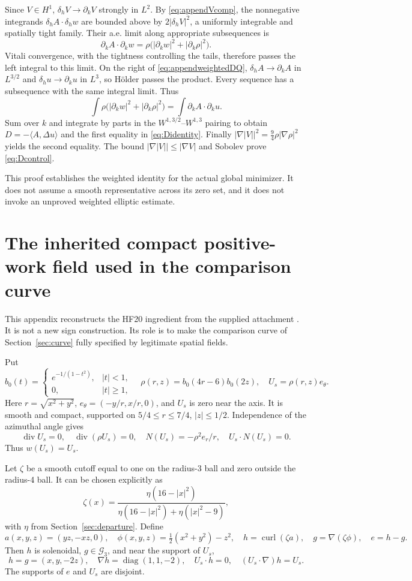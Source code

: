 \documentclass[11pt,a4paper]{article}
\theoremstyle{definition}\newtheorem{definition}[theorem]{Definition}
\theoremstyle{remark}\newtheorem{remark}[theorem]{Remark}
\newcommand{\G}{\mathcal G_3}
\newcommand{\ip}[2]{\langle #1,#2\rangle}
\newcommand{\diver}{\operatorname{div}}
\newcommand{\curl}{\operatorname{curl}}
\numberwithin{equation}{section}
\begin{document}
Since $V\in H^1$, $\delta_hV\to\partial_kV$ strongly in $L^2$. By \eqref{eq:appendVcomp}, the nonnegative integrands $\delta_hA\cdot\delta_hw$ are bounded above by $2|\delta_hV|^2$, a uniformly integrable and spatially tight family. Their a.e. limit along appropriate subsequences is
\[
 \partial_kA\cdot\partial_kw
 =\rho\bigl(|\partial_kw|^2+|\partial_k\rho|^2\bigr).
\]
Vitali convergence, with the tightness controlling the tails, therefore passes the left integral to this limit. On the right of \eqref{eq:appendweightedDQ}, $\delta_hA\to\partial_kA$ in $L^{3/2}$ and $\delta_hu\to\partial_ku$ in $L^3$, so H\"older passes the product. Every sequence has a subsequence with the same integral limit. Thus
\[
 \int\rho\bigl(|\partial_kw|^2+|\partial_k\rho|^2\bigr)
 =\int\partial_kA\cdot\partial_ku.
\]
Sum over $k$ and integrate by parts in the $W^{1,3/2}$--$W^{1,3}$ pairing to obtain $D=-\ip A{\Delta u}$ and the first equality in \eqref{eq:Didentity}. Finally
$|\nabla|V||^2=\frac94\rho|\nabla\rho|^2$ yields the second equality. The bound $|\nabla|V||\le|\nabla V|$ and Sobolev prove \eqref{eq:Dcontrol}.

This proof establishes the weighted identity for the actual global minimizer. It does not assume a smooth representative across its zero set, and it does not invoke an unproved weighted elliptic estimate.

\section{The inherited compact positive-work field used in the comparison curve}
\label{app:positive}
This appendix reconstructs the HF20 ingredient from the supplied attachment \cite[Section 6]{Attachment}. It is not a new sign construction. Its role is to make the comparison curve of Section~\ref{sec:curve} fully specified by legitimate spatial fields.

Put
\[
 b_0(t)=\begin{cases}e^{-1/(1-t^2)},&|t|<1,\\0,&|t|\ge1,\end{cases}
 \quad \rho(r,z)=b_0(4r-6)b_0(2z),\quad U_s=\rho(r,z)e_\theta.
\]
Here $r=\sqrt{x^2+y^2}$, $e_\theta=(-y/r,x/r,0)$, and $U_s$ is zero near the axis. It is smooth and compact, supported on $5/4\le r\le7/4$, $|z|\le1/2$. Independence of the azimuthal angle gives
\[
 \diver U_s=0,\quad\diver(\rho U_s)=0,\quad
 N(U_s)=-\rho^2 e_r/r,\quad U_s\cdot N(U_s)=0.
\]
Thus $w(U_s)=U_s$.

Let $\zeta$ be a smooth cutoff equal to one on the radius-3 ball and zero outside the radius-4 ball. It can be chosen explicitly as
\[
 \zeta(x)=\frac{\eta(16-|x|^2)}{\eta(16-|x|^2)+\eta(|x|^2-9)},
\]
with $\eta$ from Section~\ref{sec:departure}. Define
\[
 a(x,y,z)=(yz,-xz,0),\quad
 \phi(x,y,z)=\tfrac12(x^2+y^2)-z^2,
 \quad h=\curl(\zeta a),\quad g=\nabla(\zeta\phi),\quad e=h-g.
\]
Then $h$ is solenoidal, $g\in\G$, and near the support of $U_s$,
\[
 h=g=(x,y,-2z),\quad\nabla h=\operatorname{diag}(1,1,-2),
 \quad U_s\cdot h=0,
 \quad (U_s\cdot\nabla)h=U_s.
\]
The supports of $e$ and $U_s$ are disjoint.
\end{document}
